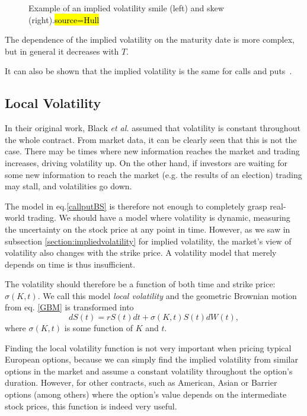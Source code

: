     
\begin{figure}[!htb]
  \begin{subfigmatrix}{2}
  \end{subfigmatrix}
  \caption[Example of an implied volatility smile and skew.]{Example of an implied volatility smile (left) and skew (right).\hl{source=Hull}}
  \label{fig:smileskew}
\end{figure}

The dependence of the implied volatility on the maturity date is more complex, but in general it decreases with $T$.

It can also be shown that the implied volatility is the same for calls and puts~\cite{Hull}.

\subsection{Local Volatility}
\label{subsection:localvolatility}
In their original work, Black \textit{et al.} assumed that volatility is constant throughout the whole contract. From market data, it can be clearly seen that this is not the case. There may be times where new information reaches the market and trading increases, driving volatility up. On the other hand, if investors are waiting for some new information to reach the market (e.g. the results of an election) trading may stall, and volatilities go down. 

The model in eq.\eqref{callputBS} is therefore not enough to completely grasp real-world trading. We should have a model where volatility is dynamic, measuring the uncertainty on the stock price at any point in time.
However, as we saw in subsection \ref{section:impliedvolatility} for implied volatility, the market's view of volatility also changes with the strike price. A volatility model that merely depends on time is thus insufficient.

The volatility should therefore be a function of both time and strike price: $\sigma(K,t)$. We call this model \emph{local volatility} and the geometric Brownian motion from eq. \ref{GBM} is transformed into
\begin{equation}\label{GBM2}
dS(t)=rS(t)dt+\sigma(K,t)S(t)dW(t),
\end{equation}
\noindent where $\sigma(K,t)$ is some function of $K$ and $t$.


Finding the local volatility function is not very important when pricing typical European options, because we can simply find the implied volatility from similar options in the market and assume a constant volatility throughout the option's duration.
However, for other contracts, such as American, Asian or Barrier options (among others) where the option's value depends on the intermediate stock prices, this function is indeed very useful.

